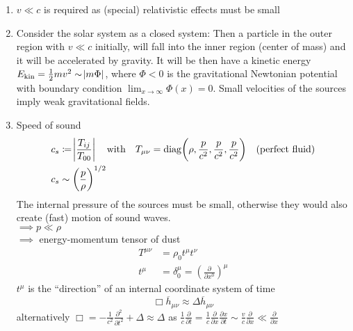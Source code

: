 \begin{enumerate}[{ad} 1.]
    \item $v\ll c$ is required as (special) relativistic effects must be small
    \item Consider the solar system as a closed system: Then a particle in the outer region with $v\ll c$ initially,
    will fall into the inner region (center of mass) and it will be accelerated by gravity. It will be then have a kinetic energy
    $E_\text{kin} = \frac{1}{2} m v^2 \sim \abs{m \Phi}$, where $\Phi < 0$ is the gravitational Newtonian potential with boundary condition
    $\displaystyle \lim_{x\to \infty}\Phi(x) = 0$. Small velocities of the
    sources imply weak gravitational fields.
    \item Speed of sound
    \begin{align}
        & c_s \coloneqq \abs{\frac{T_{ij}}{T_{00}}} \quad \text{with} \quad T_{\mu\nu} = \diag \left( \rho, \frac{p}{c^2}, \frac{p}{c^2}, \frac{p}{c^2} \right) \quad \text{(perfect fluid)} \\
        & c_s \sim \left( \frac{p}{\rho} \right)^{1/2}
    \end{align}
    The internal pressure of the sources must be small, otherwise they would also create (fast) motion of sound waves. \\
    $\implies p \ll \rho$ \\
    $\implies$ energy-momentum tensor of dust
    \begin{align}
        T^{\mu\nu} &= \rho_0 t^\mu t^\nu \\
        t^\mu &= \delta^\mu_0 = \left( \frac{\partial}{\partial x^0} \right)^\mu
    \end{align}
    $t^\mu$ is the ``direction'' of an internal coordinate system of time
    \begin{equation}
        \Box \overline{h}_{\mu\nu} \approx \Delta \overline{h}_{\mu\nu}
    \end{equation}
    alternatively $\Box = - \frac{1}{c^2} \frac{\partial^2}{\partial t^2} + \Delta \approx \Delta$ as 
    $\frac{1}{c} \frac{\partial}{\partial t} = \frac{1}{c} \frac{\partial}{\partial x} \frac{\partial x}{\partial t} 
    \sim \frac{v}{c} \frac{\partial}{\partial x} \ll \frac{\partial}{\partial x}$
\end{enumerate}

